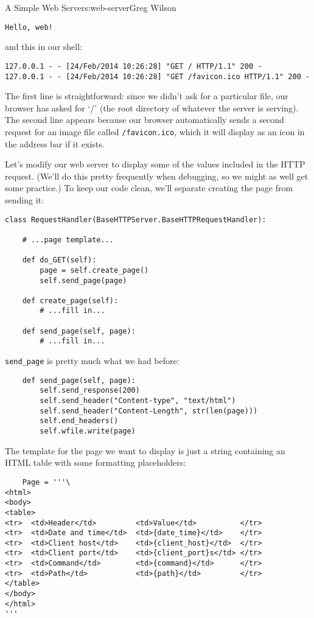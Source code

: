 \begin{aosachapter}{A Simple Web Server}{s:web-server}{Greg Wilson}
\begin{verbatim}
Hello, web!
\end{verbatim}

and this in our shell:

\begin{verbatim}
127.0.0.1 - - [24/Feb/2014 10:26:28] "GET / HTTP/1.1" 200 -
127.0.0.1 - - [24/Feb/2014 10:26:28] "GET /favicon.ico HTTP/1.1" 200 -
\end{verbatim}

The first line is straightforward: since we didn't ask for a particular
file, our browser has asked for `/' (the root directory of whatever the
server is serving). The second line appears because our browser
automatically sends a second request for an image file called
\texttt{/favicon.ico}, which it will display as an icon in the address
bar if it exists.

\label{displaying-values}

Let's modify our web server to display some of the values included in
the HTTP request. (We'll do this pretty frequently when debugging, so we
might as well get some practice.) To keep our code clean, we'll separate
creating the page from sending it:

\begin{verbatim}
class RequestHandler(BaseHTTPServer.BaseHTTPRequestHandler):

    # ...page template...

    def do_GET(self):
        page = self.create_page()
        self.send_page(page)

    def create_page(self):
        # ...fill in...

    def send_page(self, page):
        # ...fill in...
\end{verbatim}

\texttt{send\_page} is pretty much what we had before:

\begin{verbatim}
    def send_page(self, page):
        self.send_response(200)
        self.send_header("Content-type", "text/html")
        self.send_header("Content-Length", str(len(page)))
        self.end_headers()
        self.wfile.write(page)
\end{verbatim}

The template for the page we want to display is just a string containing
an HTML table with some formatting placeholders:

\begin{verbatim}
    Page = '''\
<html>
<body>
<table>
<tr>  <td>Header</td>         <td>Value</td>          </tr>
<tr>  <td>Date and time</td>  <td>{date_time}</td>    </tr>
<tr>  <td>Client host</td>    <td>{client_host}</td>  </tr>
<tr>  <td>Client port</td>    <td>{client_port}s</td> </tr>
<tr>  <td>Command</td>        <td>{command}</td>      </tr>
<tr>  <td>Path</td>           <td>{path}</td>         </tr>
</table>
</body>
</html>
'''
\end{verbatim}


\end{aosachapter}
